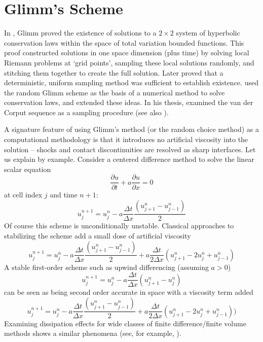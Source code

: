 \documentclass[preprint,12pt,authoryear]{elsarticle}
\begin{document}
\section{Glimm\rq{}s Scheme}
In \citep{glimm1965solutions}, Glimm proved the existence  of solutions to a  $2\times2$ 
system of hyperbolic conservation laws within the space of total variation bounded functions. 
This proof constructed solutions in one space dimension (plus time) by solving local Riemann problems at `grid points\rq{}, sampling these local solutions randomly, and stitching them together to create the full solution.  Later \citet{liu1977deterministic} proved that a deterministic, uniform sampling 
method was sufficient to establish existence. \citet{chorin1976random} used
the random Glimm scheme as the basis of a numerical method to solve conservation laws, and
\citet{concus1979numerical} extended these ideas.
In his thesis, \citet{colella1978analysis} examined the van der Corput sequence as a sampling procedure (see also \cite{colella1982glimm}).

A signature feature of using Glimm\rq{}s method (or the random choice method) as a computational methodology is that
it introduces no artificial viscosity into the solution -- shocks and contact discontinuities are
resolved as sharp interfaces.  Let us explain by example. Consider a centered difference
method to solve the linear scalar equation 
\begin{equation}
\label{linear}
\frac{\partial u}{\partial t }+ a \frac{\partial u}{\partial x} = 0
\end{equation}
at cell index $j$ and time $n+1$:
\begin{equation}
u_j^{n+1} = u_j^n - a \frac{\Delta t}{\Delta x} \frac{(u_{j+1}^n - u_{j-1}^n)}{2}
\end{equation}
Of course this scheme is unconditionally unstable. Classical approaches to stabilizing the scheme add a small dose of artificial viscosity
\begin{equation}
u_j^{n+1} = u_j^n - a \frac{\Delta t}{\Delta x} \frac{(u_{j+1}^n - u_{j-1}^n)}{2} + a \frac{\Delta t}{2 \Delta x} (u_{j+1}^n -2 u_j^n + u_{j-1}^n)
\end{equation}
A stable first-order scheme such as upwind differencing (assuming $a>0$)
\begin{equation}
u_j^{n+1} = u_j^n - a \frac{\Delta t}{\Delta x} {(u_{j+1}^n - u_{j}^n)}
\end{equation}
can be seen as being second order accurate in space with a viscosity term added
\begin{equation}
u_j^{n+1} = u_j^n - a \frac{\Delta t}{\Delta x} \frac{(u_{j+1}^n - u_{j-1}^n)}{2} + a \frac{\Delta t}{2 \Delta x} (u_{j+1}^n -2 u_j^n + u_{j-1}^n))
\end{equation}
Examining dissipation effects for wide classes of finite difference/finite volume methods 
shows a similar phenomena (see, for example, \cite{warming1974modified}).
\end{document}
